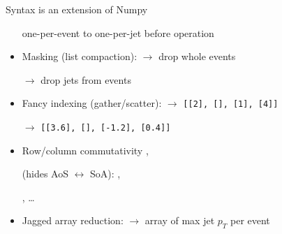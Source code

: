 \documentclass[aspectratio=169]{beamer}
\begin{document}
\begin{frame}{Syntax is an extension of Numpy}
\begin{onlyenv}
\begin{itemize}
\tabto{5.5 cm}one-per-event to one-per-jet before operation

\item Masking (list compaction):  $\to$ drop whole events

 $\to$ drop jets from events

\item Fancy indexing (gather/scatter):  $\to$ \mbox{\small \texttt{[[2], [], [1], [4]]}\hspace{-0.5 cm}}

 $\to$ \mbox{\small \texttt{[[3.6], [], [-1.2], [0.4]]}\hspace{-0.5 cm}}

\item Row/column commutativity ,

(hides AoS $\leftrightarrow$ SoA): ,

, \ldots

\item Jagged array reduction:  $\to$ array of max jet $p_T$ per event
\end{itemize}
\end{onlyenv}
\end{frame}
\end{document}

